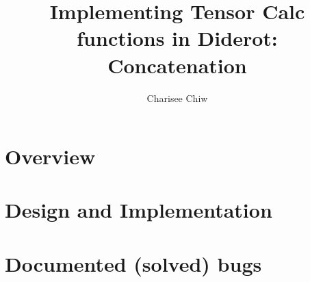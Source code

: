 \documentclass{article}
\title{Implementing Tensor Calc functions in Diderot: Concatenation}
\author{Charisee Chiw}
\begin{document}
\maketitle 


\section{Overview}

\section{Design and Implementation}

\section{Documented (solved) bugs}



 
\end{document}
